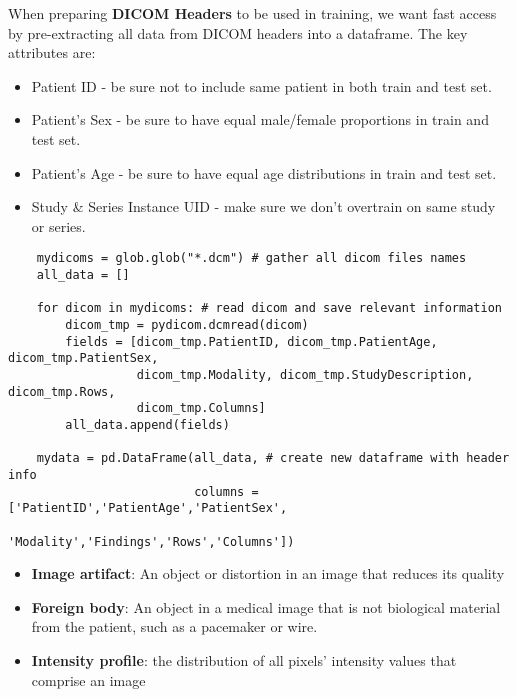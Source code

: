 \documentclass[11pt, a4paper]{article}
\begin{document}
	When preparing \textbf{DICOM Headers} to be used in training, we want fast access by pre-extracting all data from DICOM headers into a dataframe. The key attributes are:
	\begin{itemize}
		\item Patient ID - be sure not to include same patient in both train and test set.
		\item Patient's Sex - be sure to have equal male/female proportions in train and test set.
		\item Patient's Age - be sure to have equal age distributions in train and test set.
		\item Study \& Series Instance UID - make sure we don't overtrain on same study or series.
	\end{itemize}
	\begin{lstlisting}
	mydicoms = glob.glob("*.dcm") # gather all dicom files names
	all_data = []
	
	for dicom in mydicoms: # read dicom and save relevant information
		dicom_tmp = pydicom.dcmread(dicom)
		fields = [dicom_tmp.PatientID, dicom_tmp.PatientAge, dicom_tmp.PatientSex, 
		          dicom_tmp.Modality, dicom_tmp.StudyDescription, dicom_tmp.Rows, 
		          dicom_tmp.Columns]
		all_data.append(fields)
		
	mydata = pd.DataFrame(all_data, # create new dataframe with header info
	                      columns = ['PatientID','PatientAge','PatientSex',
	                                 'Modality','Findings','Rows','Columns']) \end{lstlisting}
   	\begin{itemize}
   		\item \textbf{Image artifact}: An object or distortion in an image that reduces its quality
   		\item \textbf{Foreign body}: An object in a medical image that is not biological material from the patient, such as a pacemaker or wire.
   		\item \textbf{Intensity profile}: the distribution of all pixels' intensity values that comprise an image
   	\end{itemize} \newpage

\end{document}
